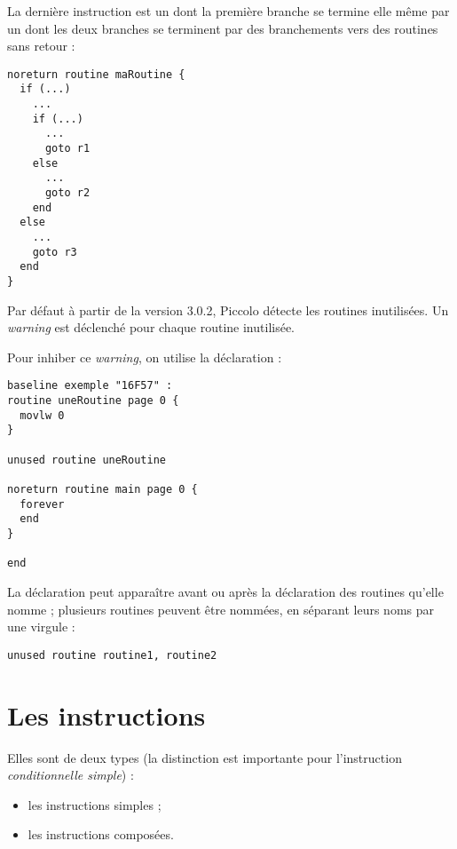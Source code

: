 La dernière instruction est un  dont la première branche se termine elle même par un  dont les deux branches se terminent par des branchements vers des routines sans retour :
\begin{lstlisting}[language=piccolo]
noreturn routine maRoutine {
  if (...)
    ...
    if (...)
      ...
      goto r1
    else
      ...
      goto r2
    end
  else
    ...
    goto r3
  end
}
\end{lstlisting}





Par défaut à partir de la version 3.0.2, Piccolo détecte les routines inutilisées. Un \emph{warning} est déclenché pour chaque routine inutilisée.

Pour inhiber ce \emph{warning}, on utilise la déclaration  :

\begin{lstlisting}[language=piccolo]
baseline exemple "16F57" :
routine uneRoutine page 0 {
  movlw 0
}

unused routine uneRoutine
 
noreturn routine main page 0 {
  forever
  end
}

end
\end{lstlisting}

La déclaration  peut apparaître avant ou après la déclaration des routines qu'elle nomme ; plusieurs routines peuvent être nommées, en séparant leurs noms par une virgule :
\begin{lstlisting}[language=piccolo]
unused routine routine1, routine2
\end{lstlisting}



\section{Les instructions}

Elles sont de deux types (la distinction est importante pour l’instruction \emph{conditionnelle simple}) :
\begin{itemize}
  \item les instructions simples ;
  \item les instructions composées.

\end{itemize}


